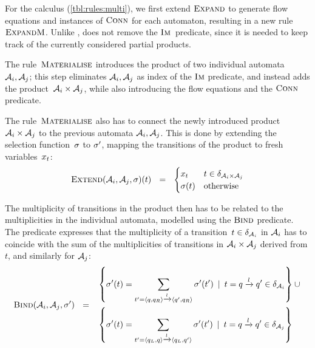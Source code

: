     For the calculus (\cref{tbl:rules:multi}), we first extend
    $\textsc{Expand}$ to generate flow equations and instances of $\operatorname{\textsc{Conn}}$
    for each automaton, resulting in a new rule $\textsc{ExpandM}$.  Unlike
    \Expand{}, \ExpandM{} does not remove the $\operatorname{\textsc{Im}}$~predicate,
    since it is needed to keep track of the currently considered
    partial products.

The rule~$\textsc{Materialise}$ introduces the product of two individual
automata~$\mathcal{A}_i, \mathcal{A}_j$; this step eliminates
$\mathcal{A}_i, \mathcal{A}_j$ as index of the $\operatorname{\textsc{Im}}$ predicate, and
instead adds the product~$\mathcal{A}_i \times \mathcal{A}_j$, while
also introducing the flow equations and the $\operatorname{\textsc{Conn}}$ predicate.

The rule~$\textsc{Materialise}$ also has to connect the newly introduced
product~$\mathcal{A}_i \times \mathcal{A}_j$ to the previous automata
$\mathcal{A}_i, \mathcal{A}_j$. This is done by extending the
selection function~$\operatorname{\sigma}$ to $\operatorname{\sigma}'$, mapping the transitions of the product
to fresh variables~$x_{t}$:
\begin{equation*}
  \textsc{Extend}(\mathcal{A}_i, \mathcal{A}_j,\sigma)(t)
  ~~=~~
  \begin{cases}
    x_{t} & t \in \delta_{\mathcal{A}_i \times \mathcal{A}_j}
    \\
    \operatorname{\sigma}(t) & \text{otherwise}
  \end{cases}
\end{equation*}

The multiplicity of transitions in the product then has to be related
to the multiplicities in the individual automata, modelled using the
$\textsc{Bind}$ predicate. The predicate expresses that the multiplicity
of a transition~$t \in \delta_{\mathcal{A}_i}$ in
$\mathcal{A}_i$ has to coincide with the sum of the multiplicities of
transitions in $\mathcal{A}_i \times \mathcal{A}_j$ derived from $t$,
and similarly for $\mathcal{A}_j$:
%
  $$
  \textsc{Bind}(\mathcal{A}_i, \mathcal{A}_j, \operatorname{\sigma}') ~~=~~
  \begin{aligned}
  & \left\{ 
    \operatorname{\sigma}'(t)  =  \sum\limits_{t' = \left\langle q, q_R\right\rangle \xrightarrow{l} \left\langle q', q_R\right\rangle} \operatorname{\sigma}'(t')
  \:\mid\: t = q \xrightarrow{l} q' \in \delta_{\mathcal{A}_i} \right\} \cup\mbox{} \\ 
  & \left\{
    \operatorname{\sigma}'(t)  =  \sum\limits_{t' = \left\langle q_L, q\right\rangle \xrightarrow{l} \left\langle q_L, q'\right\rangle} \operatorname{\sigma}'(t') \:\mid\: t = q \xrightarrow{l} q' \in \delta_{\mathcal{A}_j}
  \right\}
  \end{aligned}
$$

